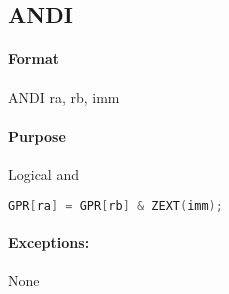 \subsection{ANDI}


\paragraph{Format} ANDI ra, rb, imm

\paragraph{Purpose} Logical and
\begin{lstlisting}[language=c]
    GPR[ra] = GPR[rb] & ZEXT(imm);
\end{lstlisting}

\paragraph{Exceptions:} None
